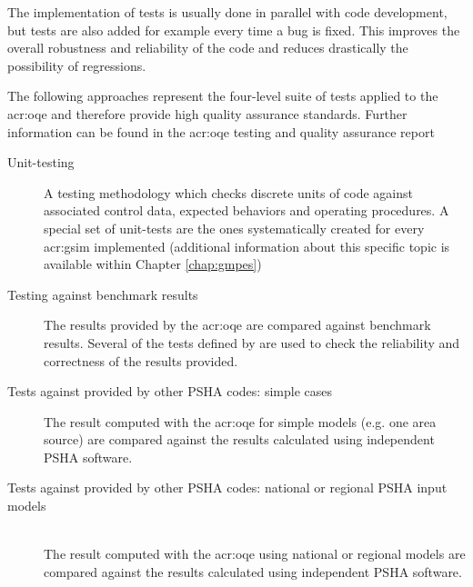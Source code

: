 The implementation of tests is usually done in parallel with code development,
but tests are also added for example every time a bug is fixed.
%
This improves the overall robustness and reliability of the code and reduces
drastically the possibility of regressions.

The following approaches represent the four-level suite of tests applied to the
\gls{acr:oqe} and therefore provide high quality assurance standards. Further
information can be found in the \gls{acr:oqe} testing and quality assurance
report \citep{pagani2014_oqtesting} 
%
\begin{description}
    \item [Unit-testing] A testing methodology which checks discrete 
        units of code against associated control data, expected behaviors 
        and operating procedures. A special set of unit-tests are the ones
        systematically created for every \gls{acr:gsim} implemented 
        (additional information about this specific topic is available within 
        Chapter \ref{chap:gmpes})
    \item [Testing against benchmark results] The results provided by the 
        \gls{acr:oqe} are compared against benchmark results. Several of the 
        tests defined by \textcite{thomas2010} are used to check the 
        reliability and correctness of the results provided. 
    \item [Tests against provided by other PSHA codes: simple cases] 
        The result computed with the \gls{acr:oqe} for simple models (e.g. one
        area source) are compared against the results calculated using 
        independent PSHA software.
    \item [Tests against provided by other PSHA codes: national or regional 
        PSHA input models] \hfill \\ The result computed with the \gls{acr:oqe} 
        using national or regional models are compared against the 
        results calculated using independent PSHA software.
\end{description}
%
%
%
%
%
